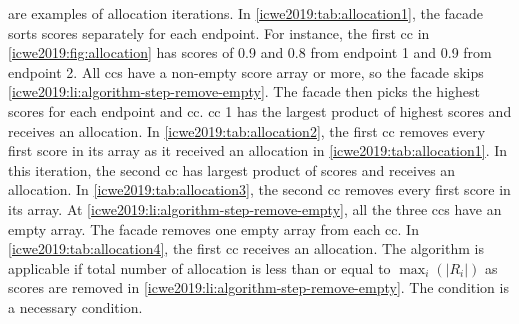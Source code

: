  are examples of allocation iterations.
In \cref{icwe2019:tab:allocation1}, the facade sorts scores separately for each endpoint.
For instance, the first \gls{cc} in \cref{icwe2019:fig:allocation} has scores of 0.9 and 0.8 from endpoint 1 and 0.9 from endpoint 2.
All \glspl{cc} have a non-empty score array or more, so the facade skips \ref{icwe2019:li:algorithm-step-remove-empty}.
The facade then picks the highest scores for each endpoint and \gls{cc}.
\Gls{cc} 1 has the largest product of highest scores and receives an allocation.
In \cref{icwe2019:tab:allocation2}, the first \gls{cc} removes every first score in its array as it received an allocation in \cref{icwe2019:tab:allocation1}.
In this iteration, the second \gls{cc} has largest product of scores and receives an allocation.
In \cref{icwe2019:tab:allocation3}, the second \gls{cc} removes every first score in its array.
At \ref{icwe2019:li:algorithm-step-remove-empty}, all the three \glspl{cc} have an empty array.
The facade removes one empty array from each \gls{cc}.
In \cref{icwe2019:tab:allocation4}, the first \gls{cc} receives an allocation.
The algorithm is applicable if total number of allocation is less than or equal to $\max_i(|R_i|)$ as scores are removed in \ref{icwe2019:li:algorithm-step-remove-empty}.
The condition is a necessary condition.

